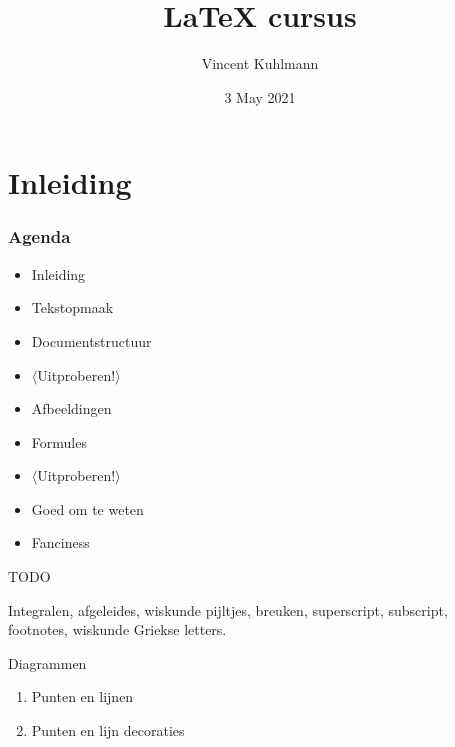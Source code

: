 

\title{\LaTeX{} cursus}
\author{Vincent Kuhlmann}
\date{3 May 2021}



\section{Inleiding}

\begin{frame}
	\titlepage
	\centering
\end{frame}


\begin{frame}
	\frametitle{Agenda}
	
	\begin{itemize}
		\item Inleiding
		\item Tekstopmaak
		\item Documentstructuur
		\item $ \langle $Uitproberen!$ \rangle $
		\item Afbeeldingen
		\item Formules
		\item $ \mathbf\langle $Uitproberen!$ \rangle $
		\item Goed om te weten
		\item Fanciness
	\end{itemize}
\end{frame}

\begin{frame}
	TODO
	
	Integralen, afgeleides, wiskunde pijltjes, breuken, superscript, subscript, footnotes, wiskunde Griekse letters.
\end{frame}











\begin{frame}{Diagrammen}
	\begin{enumerate}
		\item Punten en lijnen
		\item Punten en lijn decoraties
	\end{enumerate}
\end{frame}

